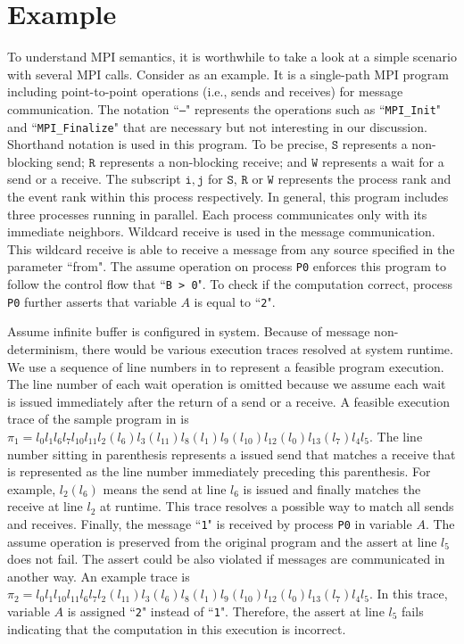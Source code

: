 \section{Example}\label{sec:example}
To understand MPI semantics, it is worthwhile to take a look at a simple scenario with several MPI calls. Consider  as an example. It is a single-path MPI program including point-to-point operations (i.e., sends and receives) for message communication. The notation ``\texttt{---}" represents the operations such as ``\texttt{MPI\_Init}" and ``\texttt{MPI\_Finalize}" that are necessary but not interesting in our discussion. Shorthand notation is used in this program. To be precise, $\mathtt{S}$ represents a non-blocking send; $\mathtt{R}$ represents a non-blocking receive; and $\mathtt{W}$ represents a wait for a send or a receive. The subscript $\mathtt{i,j}$ for $\mathtt{S}$, $\mathtt{R}$ or $\mathtt{W}$ represents the process rank and the event rank within this process respectively.
In general, this program includes three processes running in parallel. Each process communicates only with its immediate neighbors. Wildcard receive is used in the message communication. This wildcard receive is able to receive a message from any source specified in the parameter ``from". The assume operation on process \texttt{P0} enforces this program to follow the control flow that ``\texttt{B > 0}". To check if the computation correct, process \texttt{P0} further asserts that variable $A$ is equal to ``\texttt{2}".  

Assume infinite buffer is configured in system. Because of message non-determinism, there would be various execution traces resolved at system runtime. We use a sequence of line numbers in  to represent a feasible program execution. The line number of each wait operation is omitted because we assume each wait is issued immediately after the return of a send or a receive. A feasible execution trace of the sample program in  is $\pi_1 = l_0l_1l_6l_7l_{10}l_{11}l_2(l_6)l_3(l_{11})l_8(l_1)l_9(l_{10})l_{12}(l_0)l_{13}(l_7)l_4l_5$. The line number sitting in parenthesis represents a issued send that matches a receive that is represented as the line number immediately preceding this parenthesis. For example, $l_2(l_6)$ means the send at line $l_6$ is issued and finally matches the receive at line $l_2$ at runtime. This trace resolves a possible way to match all sends and receives. Finally, the message ``\texttt{1}" is received by process \texttt{P0} in variable $A$. The assume operation is preserved from the original program and the assert at line $l_5$ does not fail. The assert could be also violated if messages are communicated in another way. An example trace is $\pi_2 = l_0l_1l_{10}l_{11}l_6l_7l_2(l_{11})l_3(l_6)l_8(l_1)l_9(l_{10})l_{12}(l_0)l_{13}(l_7)l_4l_5$. In this trace, variable $A$ is assigned ``\texttt{2}" instead of ``\texttt{1}". Therefore, the assert at line $l_5$ fails indicating that the computation in this execution is incorrect. 

